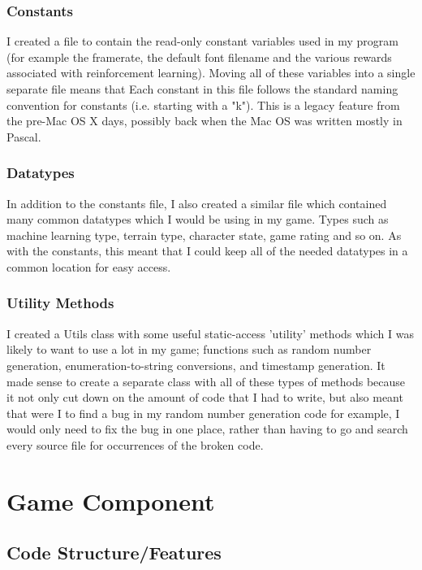 \documentclass[a4paper,oneside]{report}
\begin{document}
\subsection{Constants} 

I created a file to contain the read-only constant variables used in my program (for example the framerate, the default font filename and the various rewards associated with reinforcement learning). Moving all of these variables into a single separate file means that Each constant in this file follows the standard naming convention for constants (i.e. starting with a "k"). This is a legacy feature from the pre-Mac OS X days, possibly back when the Mac OS was written mostly in Pascal. 

\subsection{Datatypes} 

In addition to the constants file, I also created a similar file which contained many common datatypes which I would be using in my game. Types such as machine learning type, terrain type, character state, game rating and so on. As with the constants, this meant that I could keep all of the needed datatypes in a common location for easy access.

\subsection{Utility Methods} 

I created a Utils class with some useful static-access 'utility' methods which I was likely to want to use a lot in my game; functions such as random number generation, enumeration-to-string conversions, and timestamp generation. It made sense to create a separate class with all of these types of methods because it not only cut down on the amount of code that I had to write, but also meant that were I to find a bug in my random number generation code for example, I would only need to fix the bug in one place, rather than having to go and search every source file for occurrences of the broken code. 

\chapter{Game Component}
		
\section{Code Structure/Features}
\end{document}
